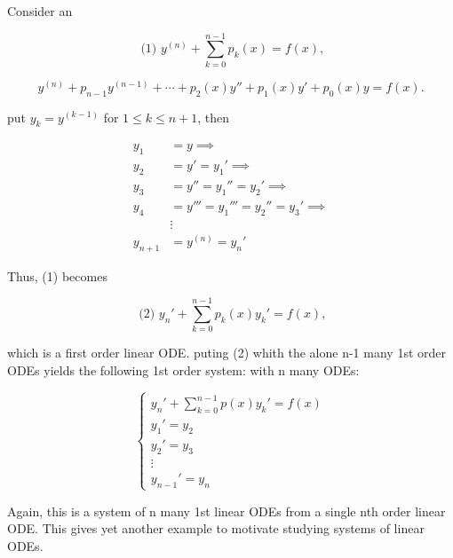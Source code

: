 \begin{example}
  Consider an 

  \[ \text{ (1) } y^{(n)}+ \sum_{k=0}^{n-1} p_k(x) = f(x), \]

  \[ y^{(n)} + p_{n-1}y^{(n-1)} + \cdots + p_2(x)y'' + p_1(x)y' +
  p_0(x)y = f(x). \]

  put \(y_k = y^{(k-1)}  \) for \( 1 \leq k \leq n+1 \), then 

  \begin{align*}
    y_1 &= y \implies \\
    y_2 &= y' = y_1' \implies \\
    y_3 &= y'' = y_1'' = y_2' \implies \\
    y_4 &= y''' = y_1''' = y_2'' = y_3'  \implies \\
    &\vdots \\
    y_{n+1} &= y^{(n)} = y_n'
  \end{align*}

  Thus, (1) becomes 

  \[ \text{ (2) } y_n' + \sum_{k=0}^{n-1}p_k(x)y_k' = f(x), \]

  which is a first order linear ODE. puting (2) whith the alone n-1
  many 1st order ODEs yields the following 1st order system: with n
  many ODEs:

  \[
  \begin{cases}
  y_n' + \sum_{k=0}^{n-1}p(x)y_k' = f(x)  \\
  y_1' = y_2 \\
  y_2' = y_3 \\
  \vdots \\
  y_{n-1}' = y_n
  \end{cases}
\]

Again, this is a system of n many 1st linear ODEs from a single nth
order linear ODE. This gives yet another example to motivate studying
systems of linear ODEs.

\end{example}

